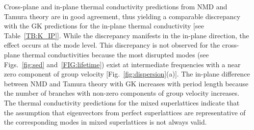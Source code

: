 \documentclass[aps,prb,preprint,preprintnumbers,amsmath,amssymb,floatfix,superscriptaddress]{revtex4}
\newcommand{\kv}{\mspace{-4.0mu}\left(\mspace{-8.0mu}
\begin{smallmatrix}&\pmb{\kappa} \\&\nu\end{smallmatrix}
\mspace{-3.0mu}\right)}
\begin{document}
Cross-plane and in-plane thermal conductivity predictions from NMD and Tamura theory are in good agreement, thus yielding a comparable discrepancy with the GK predictions for the in-plane thermal conductivity [see Table~\ref{TB:K_IP}]. While the discrepancy manifests in the in-plane direction, the effect occurs at the mode level. This discrepancy is not observed for the cross-plane thermal conductivities because the most disrupted modes (see Figs.~\ref{fig:sed} and~\ref{FIG:lifetime}) exist at intermediate frequencies with a near zero component of group velocity [Fig.~\ref{fig:dispersion}(a)]. The in-plane difference between NMD and Tamura theory with GK increases with period length because the number of branches with non-zero components of group velocity increases. The thermal conductivity predictions for the mixed superlattices indicate that the assumption that eigenvectors from perfect superlattices are representative of the corresponding modes in mixed superlattices is not always valid.

\end{document}
